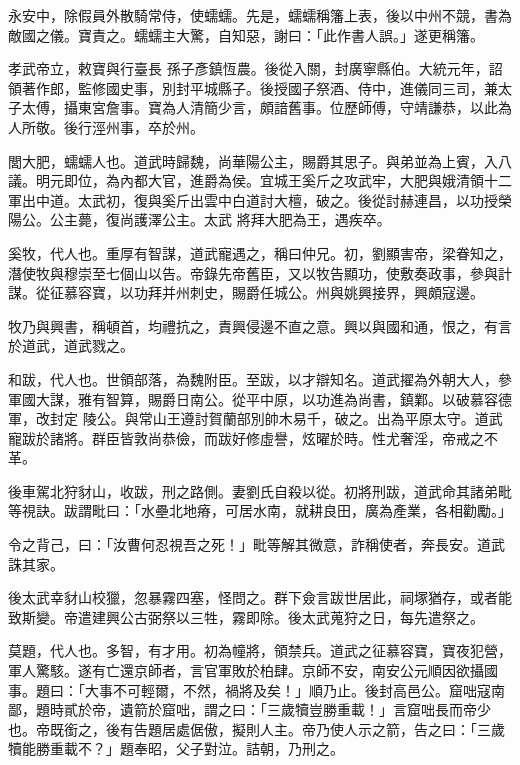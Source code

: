 \begin{pinyinscope}
 永安中，除假員外散騎常侍，使蠕蠕。先是，蠕蠕稱籓上表，後以中州不競，書為敵國之儀。寶責之。蠕蠕主大驚，自知惡，謝曰：「此作書人誤。」遂更稱籓。



 孝武帝立，敕寶與行臺長
 孫子彥鎮恆農。後從入關，封廣寧縣伯。大統元年，詔領著作郎，監修國史事，別封平城縣子。後授國子祭酒、侍中，進儀同三司，兼太子太傅，攝東宮詹事。寶為人清簡少言，頗諳舊事。位歷師傅，守靖謙恭，以此為人所敬。後行涇州事，卒於州。



 閭大肥，蠕蠕人也。道武時歸魏，尚華陽公主，賜爵其思子。與弟並為上賓，入八議。明元即位，為內都大官，進爵為侯。宜城王奚斤之攻武牢，大肥與娥清領十二軍出中道。太武初，復與奚斤出雲中白道討大檀，破之。後從討赫連昌，以功授榮陽公。公主薨，復尚護澤公主。太武
 將拜大肥為王，遇疾卒。



 奚牧，代人也。重厚有智謀，道武寵遇之，稱曰仲兄。初，劉顯害帝，梁眷知之，潛使牧與穆崇至七個山以告。帝錄先帝舊臣，又以牧告顯功，使敷奏政事，參與計謀。從征慕容寶，以功拜并州刺史，賜爵任城公。州與姚興接界，興頗寇邊。



 牧乃與興書，稱頓首，均禮抗之，責興侵邊不直之意。興以與國和通，恨之，有言於道武，道武戮之。



 和跋，代人也。世領部落，為魏附臣。至跋，以才辯知名。道武擢為外朝大人，參軍國大謀，雅有智算，賜爵日南公。從平中原，以功進為尚書，鎮鄴。以破慕容德軍，改封定
 陵公。與常山王遵討賀蘭部別帥木易千，破之。出為平原太守。道武寵跋於諸將。群臣皆敦尚恭儉，而跋好修虛譽，炫曜於時。性尤奢淫，帝戒之不革。



 後車駕北狩豺山，收跋，刑之路側。妻劉氏自殺以從。初將刑跋，道武命其諸弟毗等視訣。跋謂毗曰：「水壘北地瘠，可居水南，就耕良田，廣為產業，各相勸勵。」



 令之背己，曰：「汝曹何忍視吾之死！」毗等解其微意，詐稱使者，奔長安。道武誅其家。



 後太武幸豺山校獵，忽暴霧四塞，怪問之。群下僉言跋世居此，祠塚猶存，或者能致斯變。帝遣建興公古弼祭以三牲，霧即除。後太武蒐狩之日，每先遣祭之。



 莫題，代人也。多智，有才用。初為幢將，領禁兵。道武之征慕容寶，寶夜犯營，軍人驚駭。遂有亡還京師者，言官軍敗於柏肆。京師不安，南安公元順因欲攝國事。題曰：「大事不可輕爾，不然，禍將及矣！」順乃止。後封高邑公。窟咄寇南鄙，題時貳於帝，遺箭於窟咄，謂之曰：「三歲犢豈勝重載！」言窟咄長而帝少也。帝既銜之，後有告題居處倨傲，擬則人主。帝乃使人示之箭，告之曰：「三歲犢能勝重載不？」題奉昭，父子對泣。詰朝，乃刑之。




\end{pinyinscope}
